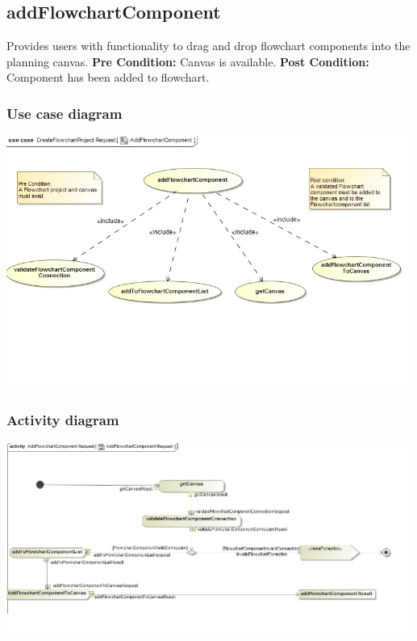 \documentclass[11pt,a4paper,titlepage]{article}
\begin{document}
\subsection{addFlowchartComponent}
Provides users with functionality to drag and drop flowchart components into the planning canvas.
\newline\newline
\textbf{Pre Condition:}
Canvas is available.\newline\newline
\textbf{Post Condition:}
Component has been added to flowchart.

\subsubsection{Use case diagram}
\includegraphics[width=500px]{AddFlowChartComponent_Usecase.jpg}

\subsubsection{Activity diagram}
\includegraphics[width=500px]{AddFlowChartComponent_Activity.jpg}
\end{document}
